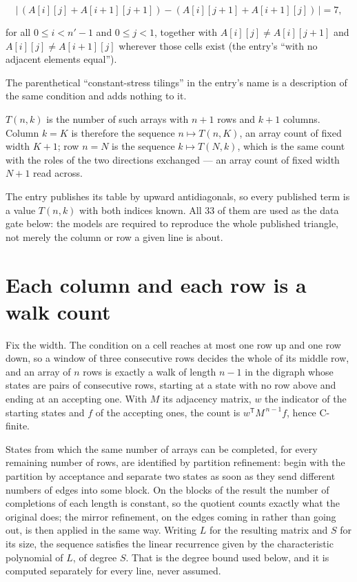 \documentclass[11pt]{article}
\theoremstyle{definition}
\begin{document}
\[\bigl|\,(A[i][j] + A[i{+}1][j{+}1]) - (A[i][j{+}1] + A[i{+}1][j])\,\bigr| = 7,\]

for all $0 \le i < n'-1$ and $0 \le j < 1$, together with $A[i][j] \ne A[i][j{+}1]$ and $A[i][j] \ne A[i{+}1][j]$ wherever those cells exist (the entry's ``with no adjacent elements equal'').

The parenthetical ``constant-stress tilings'' in the entry's name is a description of the same condition and adds nothing to it.

$T(n,k)$ is the number of such arrays with $n + 1$ rows and $k + 1$ columns. Column $k = K$ is therefore the sequence $n \mapsto T(n,K)$, an array count of fixed width $K + 1$; row $n = N$ is the sequence $k \mapsto T(N,k)$, which is the same count with the roles of the two directions exchanged --- an array count of fixed width $N + 1$ read across.

The entry publishes its table by upward antidiagonals, so every published term is a value $T(n,k)$ with both indices known. All 33 of them are used as the data gate below: the models are required to reproduce the whole published triangle, not merely the column or row a given line is about.

\section{Each column and each row is a walk count}

Fix the width. The condition on a cell reaches at most one row up and one row down, so a window of three consecutive rows decides the whole of its middle row, and an array of $n$ rows is exactly a walk of length $n-1$ in the digraph whose states are pairs of consecutive rows, starting at a state with no row above and ending at an accepting one. With $M$ its adjacency matrix, $w$ the indicator of the starting states and $f$ of the accepting ones, the count is $w^{\mathsf T}M^{\,n-1}f$, hence C-finite.

States from which the same number of arrays can be completed, for every remaining number of rows, are identified by partition refinement: begin with the partition by acceptance and separate two states as soon as they send different numbers of edges into some block. On the blocks of the result the number of completions of each length is constant, so the quotient counts exactly what the original does; the mirror refinement, on the edges coming in rather than going out, is then applied in the same way. Writing $L$ for the resulting matrix and $S$ for its size, the sequence satisfies the linear recurrence given by the characteristic polynomial of $L$, of degree $S$. That is the degree bound used below, and it is computed separately for every line, never assumed.
\end{document}

